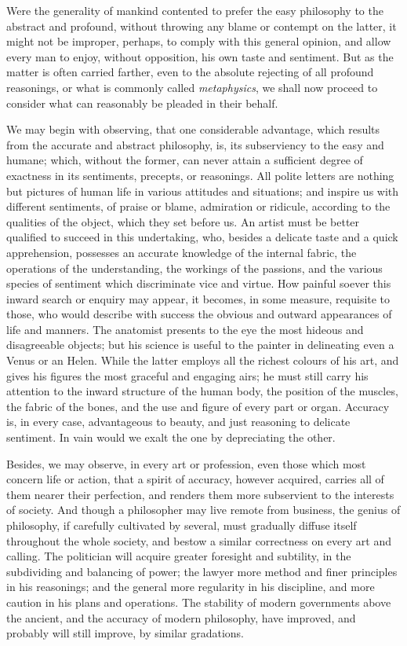 \documentclass[]{article}
\begin{document}
\begin{sectionbody}
\humeparagraph  Were the generality of mankind contented to prefer the easy philosophy to the abstract and profound, without throwing any blame or contempt on the latter, it might not be improper, perhaps, to comply with this general opinion, and allow every man to enjoy, without opposition, his own taste and sentiment. But as the matter is often carried farther, even to the absolute rejecting of all profound reasonings, or what is commonly called \emph{metaphysics}, we shall now proceed to consider what can reasonably be pleaded in their behalf.

\humeparagraph  We may begin with observing, that one considerable advantage, which results from the accurate and abstract philosophy, is, its subserviency to the easy and humane; which, without the former, can never attain a sufficient degree of exactness in its sentiments, precepts, or reasonings. All polite letters are nothing but pictures of human life in various attitudes and situations; and inspire us with different sentiments, of praise or blame, admiration or ridicule, according to the qualities of the object, which they set before us. An artist must be better qualified to succeed in this undertaking, who, besides a delicate taste and a quick apprehension, possesses an accurate knowledge of the internal fabric, the operations of the understanding, the workings of the passions, and the various species of sentiment which discriminate vice and virtue. How painful soever this inward search or enquiry may appear, it becomes, in some measure, requisite to those, who would describe with success the obvious and outward appearances of life and manners. The anatomist presents to the eye the most hideous and disagreeable objects; but his science is useful to the painter in delineating even a Venus or an Helen. While the latter employs all the richest colours of his art, and gives his figures the most graceful and engaging airs; he must still carry his attention to the inward structure of the human body, the position of the muscles, the fabric of the bones, and the use and figure of every part or organ. Accuracy is, in every case, advantageous to beauty, and just reasoning to delicate sentiment. In vain would we exalt the one by depreciating the other.

\humeparagraph  Besides, we may observe, in every art or profession, even those which most concern life or action, that a spirit of accuracy, however acquired, carries all of them nearer their perfection, and renders them more subservient to the interests of society. And though a philosopher may live remote from business, the genius of philosophy, if carefully cultivated by several, must gradually diffuse itself throughout the whole society, and bestow a similar correctness on every art and calling. The politician will acquire greater foresight and subtility, in the subdividing and balancing of power; the lawyer more method and finer principles in his reasonings; and the general more regularity in his discipline, and more caution in his plans and operations. The stability of modern governments above the ancient, and the accuracy of modern philosophy, have improved, and probably will still improve, by similar gradations.


\end{sectionbody}
\end{document}
